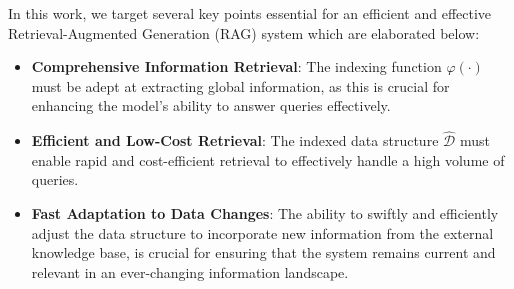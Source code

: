 

In this work, we target several key points essential for an efficient and effective Retrieval-Augmented Generation (RAG) system which are elaborated below:\vspace{-0.05in}
\begin{itemize}[leftmargin=*]

\item \textbf{Comprehensive Information Retrieval}: The indexing function $\varphi(\cdot)$ must be adept at extracting global information, as this is crucial for enhancing the model's ability to answer queries effectively.

\item \textbf{Efficient and Low-Cost Retrieval}: The indexed data structure $\hat{\mathcal{D}}$ must enable rapid and cost-efficient retrieval to effectively handle a high volume of queries.

\item \textbf{Fast Adaptation to Data Changes}: The ability to swiftly and efficiently adjust the data structure to incorporate new information from the external knowledge base, is crucial for ensuring that the system remains current and relevant in an ever-changing information landscape.

\end{itemize}

